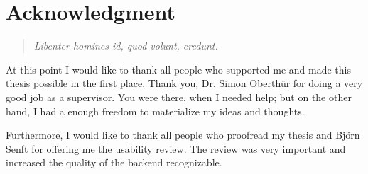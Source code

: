 





\begingroup
\let\clearpage\relax
\let\cleardoublepage\relax
\let\cleardoublepage\relax
\chapter*{Acknowledgment}

  \begin{verse}
    \textit{Libenter homines id, quod volunt, credunt.}\\
  \end{verse}

\hspace{3cm}

At this point I would like to thank all people who supported me and made this thesis possible 
in the first place. Thank you, Dr. Simon Oberth\"ur for doing a very good job as a supervisor. You were there, when I needed help; but on the other hand, I had a enough freedom to materialize my ideas and thoughts.

Furthermore, I would like to thank all people who proofread my thesis and Bj\"orn Senft for offering me the usability review. The review was very important and increased the quality of the backend recognizable. 


\endgroup



